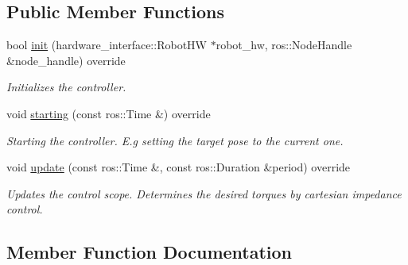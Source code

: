 \subsection*{Public Member Functions}
\begin{DoxyCompactItemize}
\item 
bool \hyperlink{classcartesian__impedance__controller_1_1CartesianImpedanceController_a1bf73fb434dfcca25dd006ea677cf679}{init} (hardware\+\_\+interface\+::\+Robot\+HW $\ast$robot\+\_\+hw, ros\+::\+Node\+Handle \&node\+\_\+handle) override
\begin{DoxyCompactList}\small\item\em Initializes the controller. \end{DoxyCompactList}\item 
\mbox{\label{classcartesian__impedance__controller_1_1CartesianImpedanceController_a88e3813e943ff17f7dd5cc059893a9fb}} 
void \hyperlink{classcartesian__impedance__controller_1_1CartesianImpedanceController_a88e3813e943ff17f7dd5cc059893a9fb}{starting} (const ros\+::\+Time \&) override
\begin{DoxyCompactList}\small\item\em Starting the controller. E.\+g setting the target pose to the current one. \end{DoxyCompactList}\item 
void \hyperlink{classcartesian__impedance__controller_1_1CartesianImpedanceController_a162ec78cc09242e43edc695eab7c0a3f}{update} (const ros\+::\+Time \&, const ros\+::\+Duration \&period) override
\begin{DoxyCompactList}\small\item\em Updates the control scope. Determines the desired torques by cartesian impedance control. \end{DoxyCompactList}\end{DoxyCompactItemize}


\subsection{Member Function Documentation}
\mbox{\label{classcartesian__impedance__controller_1_1CartesianImpedanceController_a1bf73fb434dfcca25dd006ea677cf679}} 
